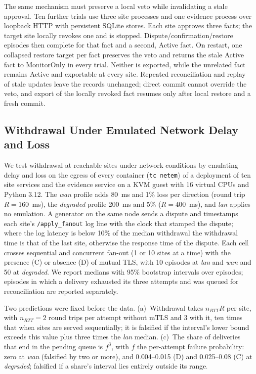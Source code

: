\documentclass[journal]{IEEEtran}
\theoremstyle{definition}
\begin{document}
The same mechanism must preserve a local veto while invalidating a stale approval. Ten further trials use three site processes and one evidence process over loopback HTTP with persistent SQLite stores. Each site approves three facts; the target site locally revokes one and is stopped. Dispute/confirmation/restore episodes then complete for that fact and a second, Active fact. On restart, one collapsed restore target per fact preserves the veto and returns the stale Active fact to MonitorOnly in every trial. Neither is exported, while the unrelated fact remains Active and exportable at every site. Repeated reconciliation and replay of stale updates leave the records unchanged; direct commit cannot override the veto, and export of the locally revoked fact resumes only after local restore and a fresh commit.


\subsection{Withdrawal Under Emulated Network Delay and Loss}
\label{sec:netem-results}
We test withdrawal at reachable sites under network conditions by emulating delay and loss on the egress of every container (\texttt{tc netem}) of a deployment of ten site services and the evidence service on a KVM guest with 16 virtual CPUs and Python 3.12. The \emph{wan} profile adds 80~ms and 1\% loss per direction (round trip $R=160$~ms), the \emph{degraded} profile 200~ms and 5\% ($R=400$~ms), and \emph{lan} applies no emulation. A generator on the same node sends a dispute and timestamps each site's \texttt{/apply\_fanout} log line with the clock that stamped the dispute; where the log latency is below 10\% of the median withdrawal the withdrawal time is that of the last site, otherwise the response time of the dispute. Each cell crosses sequential and concurrent fan-out (1 or 10 sites at a time) with the presence (C) or absence (D) of mutual TLS, with 10 episodes at \emph{lan} and \emph{wan} and 50 at \emph{degraded}. We report medians with 95\% bootstrap intervals over episodes; episodes in which a delivery exhausted its three attempts and was queued for reconciliation are reported separately.

Two predictions were fixed before the data. (a)~Withdrawal takes $n_{RTT}R$ per site, with $n_{RTT}=2$ round trips per attempt without mTLS and 3 with it, ten times that when sites are served sequentially; it is falsified if the interval's lower bound exceeds this value plus three times the \emph{lan} median. (c)~The share of deliveries that end in the pending queue is $f^3$, with $f$ the per-attempt failure probability: zero at \emph{wan} (falsified by two or more), and 0.004--0.015 (D) and 0.025--0.08 (C) at \emph{degraded}; falsified if a share's interval lies entirely outside its range.
\end{document}
